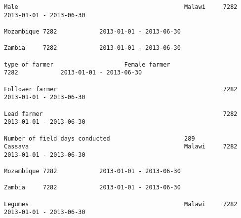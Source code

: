 \documentclass[11pt]{article}
\begin{document}
\begin{Verbatim}[commandchars=\\\{\}]
                                                                                                                                                              Male                                               Malawi     7282            2013-01-01 - 2013-06-30   
                                                                                                                                                                                                                 Mozambique 7282            2013-01-01 - 2013-06-30   
                                                                                                                                                                                                                 Zambia     7282            2013-01-01 - 2013-06-30   
                                                                                                                            type of farmer                    Female farmer                                                 7282            2013-01-01 - 2013-06-30   
                                                                                                                                                              Follower farmer                                               7282            2013-01-01 - 2013-06-30   
                                                                                                                                                              Lead farmer                                                   7282            2013-01-01 - 2013-06-30   
                                                                         Number of field days conducted                     289                               Cassava                                            Malawi     7282            2013-01-01 - 2013-06-30   
                                                                                                                                                                                                                 Mozambique 7282            2013-01-01 - 2013-06-30   
                                                                                                                                                                                                                 Zambia     7282            2013-01-01 - 2013-06-30   
                                                                                                                                                              Legumes                                            Malawi     7282            2013-01-01 - 2013-06-30   

\end{Verbatim}
\end{document}
